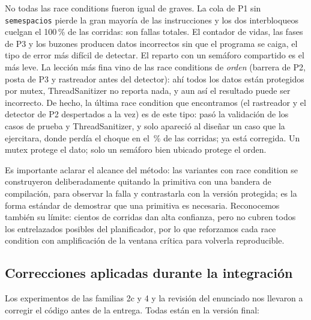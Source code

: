 \documentclass[11pt,a4paper]{article}
\newcommand{\cod}[1]{\texttt{#1}}
\renewcommand{\_}{\textunderscore\allowbreak}
\begin{document}
No todas las race conditions fueron igual de graves. La cola de P1 sin \cod{sem\_espacios} pierde la gran mayoría de las instrucciones y los dos interbloqueos cuelgan el 100\,\% de las corridas: son fallas totales. El contador de vidas, las fases de P3 y los buzones producen datos incorrectos sin que el programa se caiga, el tipo de error más difícil de detectar. El reparto con un semáforo compartido es el más leve. La lección más fina vino de las race conditions de \emph{orden} (barrera de P2, posta de P3 y rastreador antes del detector): ahí todos los datos están protegidos por mutex, ThreadSanitizer no reporta nada, y aun así el resultado puede ser incorrecto. De hecho, la última race condition que encontramos (el rastreador y el detector de P2 despertados a la vez) es de este tipo: pasó la validación de los casos de prueba y ThreadSanitizer, y solo apareció al diseñar un caso que la ejercitara, donde perdía el choque en el \NtrackRealPierde\,\% de las corridas; ya está corregida. Un mutex protege el dato; solo un semáforo bien ubicado protege el orden.

Es importante aclarar el alcance del método: las variantes con race condition se construyeron deliberadamente quitando la primitiva con una bandera de compilación, para observar la falla y contrastarla con la versión protegida; es la forma estándar de demostrar que una primitiva es necesaria. Reconocemos también su límite: cientos de corridas dan alta confianza, pero no cubren todos los entrelazados posibles del planificador, por lo que reforzamos cada race condition con amplificación de la ventana crítica para volverla reproducible.

\subsection{Correcciones aplicadas durante la integración}

Los experimentos de las familias 2c y 4 y la revisión del enunciado nos llevaron a corregir el código antes de la entrega. Todas están en la versión final:
\end{document}
